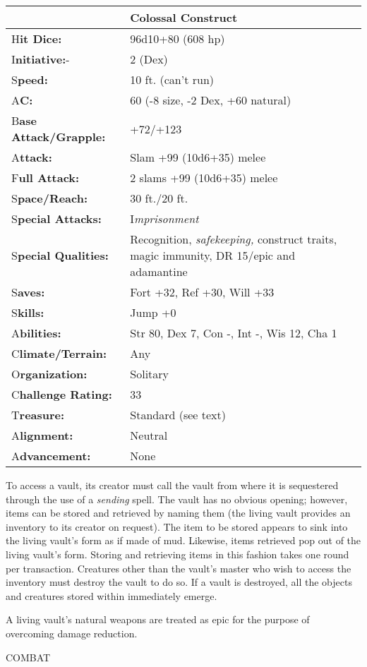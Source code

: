 \documentclass{article}
\begin{document}
{\begin{tabular}{|>{\raggedright}p{68pt}|>{\raggedright}p{257pt}|}
\hline
  & Colossal Construct \tabularnewline
\hline
H\textbf{it Dice:} & 96d10+80 (608 hp)\tabularnewline
\hline
I\textbf{nitiative:}- & 2 (Dex) \tabularnewline
\hline
S\textbf{peed:} & 10 ft. (can't run) \tabularnewline
\hline
A\textbf{C:} & 60 (-8 size, -2 Dex, +60 natural) \tabularnewline
\hline
B\textbf{ase Attack/Grapple:} & +72/+123\tabularnewline
\hline
A\textbf{ttack:} & Slam +99 (10d6+35) melee\tabularnewline
\hline
F\textbf{ull Attack:} & 2 slams +99 (10d6+35) melee\tabularnewline
\hline
S\textbf{pace/Reach:} & 30 ft./20 ft. \tabularnewline
\hline
S\textbf{pecial Attacks:} & I\textit{mprisonment}\tabularnewline
\hline
S\textbf{pecial Qualities:} & Recognition, \textit{safekeeping, }construct traits, 
magic immunity, DR 15/epic and adamantine \tabularnewline
\hline
S\textbf{aves:} & Fort +32, Ref +30, Will +33 \tabularnewline
\hline
S\textbf{kills:} & Jump +0\tabularnewline
\hline
A\textbf{bilities:} & Str 80, Dex 7, Con -, Int -, Wis 12, Cha 1 \tabularnewline
\hline
C\textbf{limate/Terrain:} & Any \tabularnewline
\hline
O\textbf{rganization:} & Solitary \tabularnewline
\hline
C\textbf{hallenge Rating:} & 33 \tabularnewline
\hline
T\textbf{reasure:} & Standard (see text) \tabularnewline
\hline
A\textbf{lignment:} & Neutral \tabularnewline
\hline
A\textbf{dvancement:} & None \tabularnewline
\hline
\end{tabular}

To access a vault, its creator must call the vault from where it is sequestered 
through the use of a \textit{sending }spell. The vault has no obvious opening; 
however, items can be stored and retrieved by naming them (the living vault provides 
an inventory to its creator on request). The item to be stored appears to sink 
into the living vault's form as if made of mud. Likewise, items retrieved pop out 
of the living vault's form. Storing and retrieving items in this fashion takes 
one round per transaction. Creatures other than the vault's master who wish to 
access the inventory must destroy the vault to do so. If a vault is destroyed, 
all the objects and creatures stored within immediately emerge. 

A living vault's natural weapons are treated as epic for the purpose of overcoming 
damage reduction.

COMBAT 

}
\end{document}
